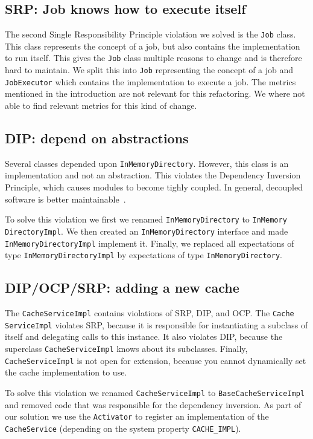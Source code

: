 \documentclass{article}
\begin{document}
\subsection{SRP: Job knows how to execute itself}
The second Single Responsibility Principle violation we solved is the \verb|Job| class. This class represents the concept of a job, but also contains the implementation to run itself. This gives the \verb|Job| class multiple reasons to change and is therefore hard to maintain.
We split this into \verb|Job| representing the concept of a job and \verb|JobExecutor| which contains the implementation to execute a job. The metrics mentioned in the introduction are not relevant for this refactoring. We where not able to find relevant metrics for this kind of change.


\subsection{DIP: depend on abstractions}
Several classes depended upon \verb|InMemoryDirectory|. However, this class is an implementation and not an abstraction. This violates the Dependency Inversion Principle, which causes modules to become tighly coupled. In general, decoupled software is better maintainable~\cite{martin2003agile}.

To solve this violation we first we renamed \verb|InMemoryDirectory| to \texttt{InMemory DirectoryImpl}. We then created an \texttt{InMemoryDirectory} interface and made \verb|InMemoryDirectoryImpl| implement it. Finally, we replaced all expectations of type \verb|InMemoryDirectoryImpl| by expectations of type \verb|InMemoryDirectory|.

\subsection{DIP/OCP/SRP: adding a new cache}
The \verb|CacheServiceImpl| contains violations of SRP, DIP, and OCP. The \texttt{Cache ServiceImpl} violates SRP, because it is responsible for instantiating a subclass of itself and delegating calls to this instance. It also violates DIP, because the superclass \verb|CacheServiceImpl| knows about its subclasses. Finally, \verb|CacheServiceImpl| is not open for extension, because you cannot dynamically set the cache implementation to use.

To solve this violation we renamed \verb|CacheServiceImpl| to \texttt{BaseCacheServiceImpl} and removed code that was responsible for the dependency inversion. As part of our solution we use the \verb|Activator| to register an implementation of the \verb|CacheService| (depending on the system property \verb|CACHE_IMPL|).
\end{document}
